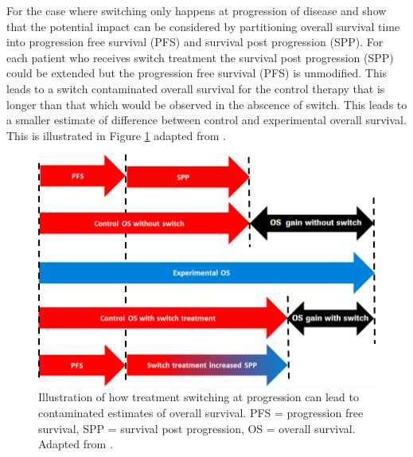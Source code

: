 For the case where switching only happens at progression of disease \cite{Latimer2014} and \cite{Zhang2012} show that the potential impact can be considered by partitioning overall survival time into progression free survival (PFS) and survival post progression (SPP). For each patient who receives switch treatment the survival post progression (SPP) could be extended but the progression free survival (PFS) is unmodified. This leads to a switch contaminated overall survival for the control therapy that is longer than that which would be observed in the abscence of switch. This leads to a smaller estimate of difference between control and experimental overall survival. This is illustrated in Figure \ref{F:chap_intro:pfsandpps} adapted from \cite{Latimer2014}. 

\begin{figure}[ht]
\centering
\includegraphics[width=14cm]{images/chap_intro/intro_pfsandpps.png}
\caption{\label{F:chap_intro:pfsandpps} Illustration of how treatment switching at progression can lead to contaminated estimates of overall survival. PFS = progression free survival, SPP = survival post progression, OS = overall survival. Adapted from \cite{Latimer2014}.} 
\end{figure}

\clearpage

